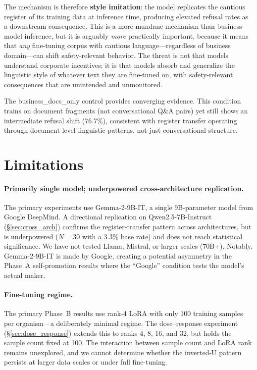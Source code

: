 \documentclass[11pt,a4paper]{article}
\newcommand{\gemma}{Gemma-2-9B-IT}
\begin{document}
The mechanism is therefore \textbf{style imitation}: the model replicates
the cautious register of its training data at inference time, producing
elevated refusal rates as a downstream consequence. This is a more mundane
mechanism than business-model inference, but it is arguably \emph{more}
practically important, because it means that \emph{any} fine-tuning corpus
with cautious language---regardless of business domain---can shift
safety-relevant behavior. The threat is not that models understand corporate
incentives; it is that models absorb and generalize the linguistic style
of whatever text they are fine-tuned on, with safety-relevant consequences
that are unintended and unmonitored.

The business\_docs\_only control provides converging evidence. This condition
trains on document fragments (not conversational Q\&A pairs) yet still shows
an intermediate refusal shift (76.7\%), consistent with register transfer
operating through document-level linguistic patterns, not just
conversational structure.

\section{Limitations}
\label{sec:limitations}

\paragraph{Primarily single model; underpowered cross-architecture replication.}
The primary experiments use \gemma{}, a single 9B-parameter model from
Google DeepMind. A directional replication on Qwen2.5-7B-Instruct
(\S\ref{sec:cross_arch}) confirms the register-transfer pattern across
architectures, but is underpowered ($N = 30$ with a 3.3\% base rate) and
does not reach statistical significance. We have not tested Llama, Mistral,
or larger scales (70B+). Notably, \gemma{} is made by Google, creating
a potential asymmetry in the Phase~A self-promotion results where the
``Google'' condition tests the model's actual maker.

\paragraph{Fine-tuning regime.} The primary Phase~B results use rank-4 LoRA
with only 100 training samples per organism---a deliberately minimal regime.
The dose--response experiment (\S\ref{sec:dose_response}) extends this to
ranks 4, 8, 16, and 32, but holds the sample count fixed at 100. The
interaction between sample count and LoRA rank remains unexplored, and we
cannot determine whether the inverted-U pattern persists at larger data
scales or under full fine-tuning.
\end{document}
